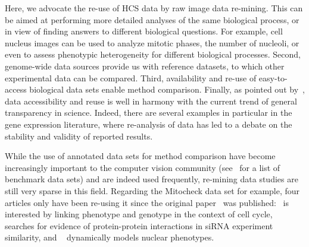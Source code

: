 Here, we advocate the re-use of HCS data by raw image data re-mining. This can be aimed at performing more detailed analyses of the same biological process, or in view of finding answers to different biological questions. For example, cell nucleus images can be used to analyze mitotic phases, the number of nucleoli, or even to assess phenotypic heterogeneity for different biological processes. Second,
genome-wide data sources provide us with reference datasets, to which other experimental data can be compared. Third, availability and re-use of easy-to-access biological data sets enable method
comparison. Finally, as pointed out by~\cite{pmid24904347}, data accessibility and reuse is well
in harmony with the current trend of general transparency in science. Indeed, there are several examples in particular in the gene expression literature, where re-analysis of data has led to a debate on the stability and validity of reported results. 

While the use of annotated data sets for method comparison have become
increasingly important to the computer vision community
(see~\cite{pmid24904347} for a list of benchmark data sets) and are
indeed used frequently, re-mining data studies are still very sparse in this field. Regarding the Mitocheck data set for example, four articles only have been re-using it since the original paper~\cite{pmid20360735} was published:~\cite{ostaszewski2012evolutionary} is interested by linking phenotype and genotype in the context of cell cycle,~\cite{pmid25255318} searches for evidence of
protein-protein interactions in siRNA experiment similarity, and ~\cite{pmid24131777} dynamically models nuclear phenotypes. 

